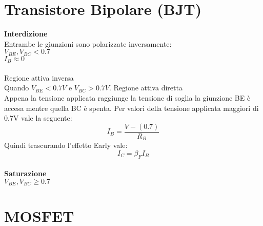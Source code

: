 \documentclass{article}
\begin{document}
\section*{Transistore Bipolare (BJT)}
\textbf{Interdizione}\\
Entrambe le giunzioni sono polarizzate inversamente:\\
\hspace*{2cm} $V_{BE}, V_{BC} < 0.7$\\
\hspace*{2cm} $I_B \approx 0$\\
\\
Regione attiva inversa\\
Quando $V_{BE} < 0.7V$ e $V_{BC} > 0.7V$.
Regione attiva diretta\\
Appena la tensione applicata raggiunge la tensione di soglia la giunzione BE è accesa mentre quella BC è spenta. Per valori della tensione applicata maggiori di 0.7V vale la seguente:
\begin{equation*}
I_B = \frac{V - (0.7)}{R_B}
\end{equation*}
Quindi trascurando l'effetto Early vale:
\begin{equation*}
I_C = \beta_F I_B
\end{equation*}
\\
\textbf{Saturazione}\\
\hspace*{2cm} $V_{BE}, V_{BC} \geqslant 0.7$\\

\section*{MOSFET}
\end{document}
